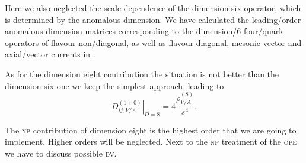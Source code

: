 \documentclass[../../index.tex]{subfiles}
\begin{document}
Here we also neglected the scale dependence of the dimension six operator, which
is determined by the anomalous dimension. We have calculated the
leading\-/order anomalous dimension matrices corresponding to the dimension\-/6
four\-/quark operators of flavour non\-/diagonal, as well as flavour diagonal,
mesonic vector and axial\-/vector currents in \cite{Boito2015}.

As for the dimension eight contribution the situation is not better than the
dimension six one we keep the simplest approach, leading to
\begin{equation}
  \left. D_{ij,V/A}^{(1+0)} \right\rvert_{D=8} = 4 \frac{\rho_{V/A}^{(8)}}{s^4}.
\end{equation}

The \textsc{np} contribution of dimension eight is the highest order that we are
going to implement. Higher orders will be neglected. Next to the \textsc{np}
treatment of the \textsc{ope} we have to discuss possible \textsc{dv}.
\end{document}
